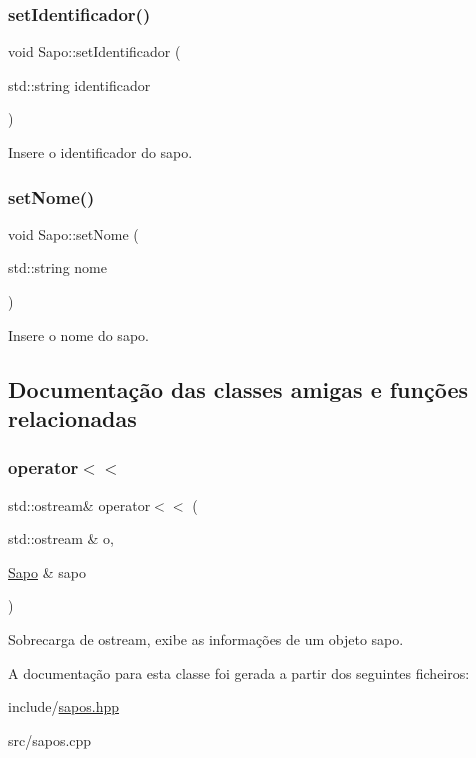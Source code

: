 \subsubsection{\texorpdfstring{set\+Identificador()}{setIdentificador()}}
{\footnotesize\ttfamily void Sapo\+::set\+Identificador (\begin{DoxyParamCaption}\item[{std\+::string}]{identificador }\end{DoxyParamCaption})}



Insere o identificador do sapo. 

\mbox{\label{classSapo_aacafe6399f877e9bda12c146531fe31f}} 
\subsubsection{\texorpdfstring{set\+Nome()}{setNome()}}
{\footnotesize\ttfamily void Sapo\+::set\+Nome (\begin{DoxyParamCaption}\item[{std\+::string}]{nome }\end{DoxyParamCaption})}



Insere o nome do sapo. 



\subsection{Documentação das classes amigas e funções relacionadas}
\mbox{\label{classSapo_a295992e9cef7ed41031bd2a0a9e70646}} 
\subsubsection{\texorpdfstring{operator$<$$<$}{operator<<}}
{\footnotesize\ttfamily std\+::ostream\& operator$<$$<$ (\begin{DoxyParamCaption}\item[{std\+::ostream \&}]{o,  }\item[{\hyperlink{classSapo}{Sapo} \&}]{sapo }\end{DoxyParamCaption})\hspace{0.3cm}{\ttfamily [friend]}}



Sobrecarga de ostream, exibe as informações de um objeto sapo. 



A documentação para esta classe foi gerada a partir dos seguintes ficheiros\+:\begin{DoxyCompactItemize}
\item 
include/\hyperlink{sapos_8hpp}{sapos.\+hpp}\item 
src/sapos.\+cpp\end{DoxyCompactItemize}
